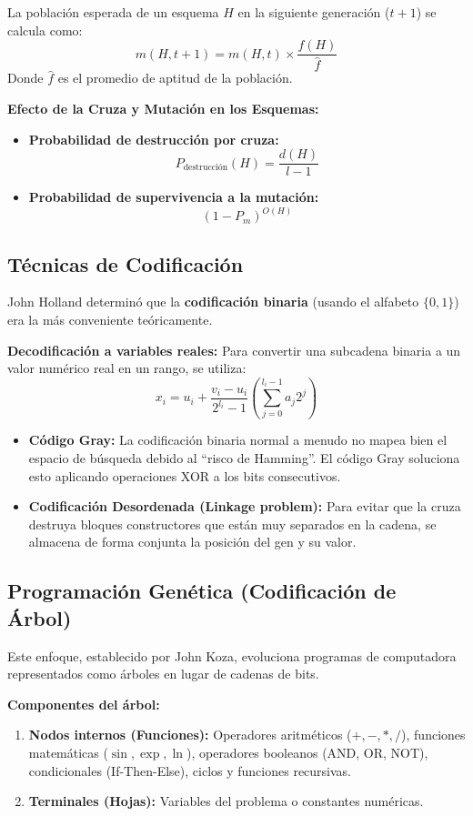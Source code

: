 \documentclass{article}
\begin{document}
	La población esperada de un esquema $H$ en la siguiente generación ($t+1$) se calcula como:
	$$m(H,t+1) = m(H,t) \times \frac{f(H)}{\hat{f}}$$
	Donde $\hat{f}$ es el promedio de aptitud de la población.
	
	\textbf{Efecto de la Cruza y Mutación en los Esquemas:}
	\begin{itemize}
		\item \textbf{Probabilidad de destrucción por cruza:} $$P_{\text{destrucción}}(H) = \frac{d(H)}{l-1}$$
		\item \textbf{Probabilidad de supervivencia a la mutación:} $$(1-P_{m})^{O(H)}$$
	\end{itemize}
	
	\subsection{Técnicas de Codificación}
	John Holland determinó que la \textbf{codificación binaria} (usando el alfabeto $\{0,1\}$) era la más conveniente teóricamente.
	
	\textbf{Decodificación a variables reales:}
	Para convertir una subcadena binaria a un valor numérico real en un rango, se utiliza:
	$$x_{i} = u_{i} + \frac{v_{i}-u_{i}}{2^{l_{i}}-1} \left( \sum_{j=0}^{l_{i}-1} a_{j} 2^{j} \right)$$
	
	\begin{itemize}
		\item \textbf{Código Gray:} La codificación binaria normal a menudo no mapea bien el espacio de búsqueda debido al ``risco de Hamming''. El código Gray soluciona esto aplicando operaciones XOR a los bits consecutivos.
		\item \textbf{Codificación Desordenada (Linkage problem):} Para evitar que la cruza destruya bloques constructores que están muy separados en la cadena, se almacena de forma conjunta la posición del gen y su valor.
	\end{itemize}
	
	\subsection{Programación Genética (Codificación de Árbol)}
	Este enfoque, establecido por John Koza, evoluciona programas de computadora representados como árboles en lugar de cadenas de bits.
	
	\textbf{Componentes del árbol:}
	\begin{enumerate}
		\item \textbf{Nodos internos (Funciones):} Operadores aritméticos ($+,-,*,/$), funciones matemáticas ($\sin, \exp, \ln$), operadores booleanos (AND, OR, NOT), condicionales (If-Then-Else), ciclos y funciones recursivas.
		\item \textbf{Terminales (Hojas):} Variables del problema o constantes numéricas.
	\end{enumerate}
	
\end{document}
